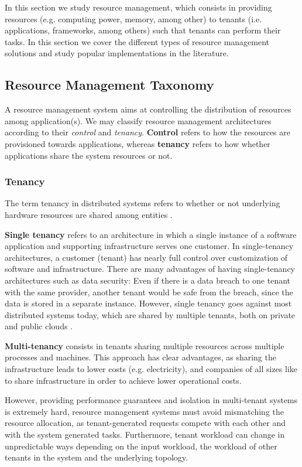 
In this section we study resource management, which consists in providing resources (e.g. computing power, memory, among other) to tenants (i.e. applications, frameworks, among others) such that tenants can perform their tasks. In this section we cover the different types of resource management solutions and study popular implementations in the literature.

\subsection{Resource Management Taxonomy}

A resource management system aims at controlling the distribution of resources among application(s). We may classify resource management architectures according to their \textit{control} and \textit{tenancy}. \textbf{Control} refers to how the resources are provisioned towards applications, whereas \textbf{tenancy} refers to how whether applications share the system resources or not.

\subsubsection{Tenancy}

The term tenancy in distributed systems refers to whether or not underlying hardware resources are shared among entities \cite{Hong2019}. 

\textbf{Single tenancy} refers to an architecture in which a single instance of a software application and supporting infrastructure serves one customer. In single-tenancy architectures, a customer (tenant) has nearly full control over customization of software and infrastructure. There are many advantages of having single-tenancy architectures such as data security: Even if there is a data breach to one tenant with the same provider, another tenant would be safe from the breach, since the data is stored in a separate instance. However, single tenancy goes against most distributed systems today, which are shared by multiple tenants, both on private and public clouds \cite{mace2015retro}.

\textbf{Multi-tenancy} consists in tenants sharing multiple resources across multiple processes and machines. This approach has clear advantages, as sharing the infrastructure leads to lower costs (e.g. electricity), and companies of all sizes like to share infrastructure in order to achieve lower operational costs. 

However, providing performance guarantees and isolation in multi-tenant systems is extremely hard, resource management systems must avoid mismatching the resource allocation, as tenant-generated requests compete with each other and with the system generated tasks. Furthermore, tenant workload can change in unpredictable ways depending on the input workload, the workload of other tenants in the system and the underlying topology. 

